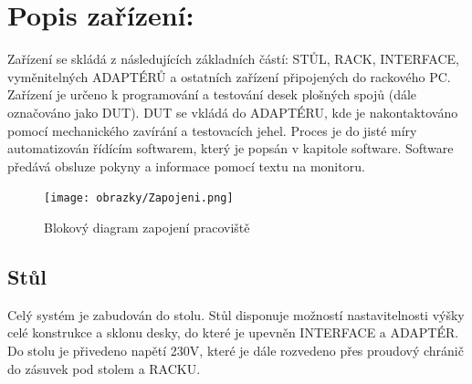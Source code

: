 
\chapter{Popis zařízení:}
		Zařízení se skládá z následujících základních částí: STŮL, RACK, INTERFACE, vyměnitelných ADAPTÉRŮ
		a ostatních zařízení připojených do rackového PC. Zařízení je určeno k programování a testování
		desek plošných spojů (dále označováno jako DUT). DUT se vkládá do ADAPTÉRU, kde je nakontaktováno pomocí mechanického
		zavírání a testovacích jehel. Proces je do jisté míry automatizován řídícím softwarem,
		který je popsán v kapitole software. Software předává obsluze pokyny a informace pomocí textu na monitoru. 
		
		\begin{figure}[ht!]
			\centering
			\texttt{[image: obrazky/Zapojeni.png]}
			\caption{Blokový diagram zapojení pracoviště}
            \label{fig:Blokový diagram zapojení pracoviště}
		\end{figure}
\clearpage
	\section{Stůl}
	Celý systém je zabudován do stolu. Stůl disponuje možností nastavitelnosti výšky celé konstrukce a sklonu desky,
	do které je upevněn INTERFACE a ADAPTÉR. Do stolu je přivedeno napětí 230V,
	které je dále rozvedeno přes proudový chránič do zásuvek pod stolem a RACKU.\\

